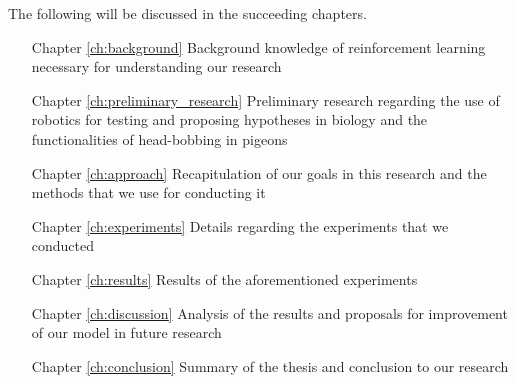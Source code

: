 The following will be discussed in the succeeding chapters.
\begin{itemize}
  \item [Chapter \ref{ch:background}] Background knowledge of reinforcement learning necessary for understanding our research
  \item [Chapter \ref{ch:preliminary_research}] Preliminary research regarding the use of robotics for testing and proposing hypotheses in biology and the functionalities of head-bobbing in pigeons
  \item [Chapter \ref{ch:approach}] Recapitulation of our goals in this research and the methods that we use for conducting it
  \item [Chapter \ref{ch:experiments}] Details regarding the experiments that we conducted
  \item [Chapter \ref{ch:results}] Results of the aforementioned experiments
  \item [Chapter \ref{ch:discussion}] Analysis of the results and proposals for improvement of our model in future research
  \item [Chapter \ref{ch:conclusion}] Summary of the thesis and conclusion to our research
\end{itemize}
